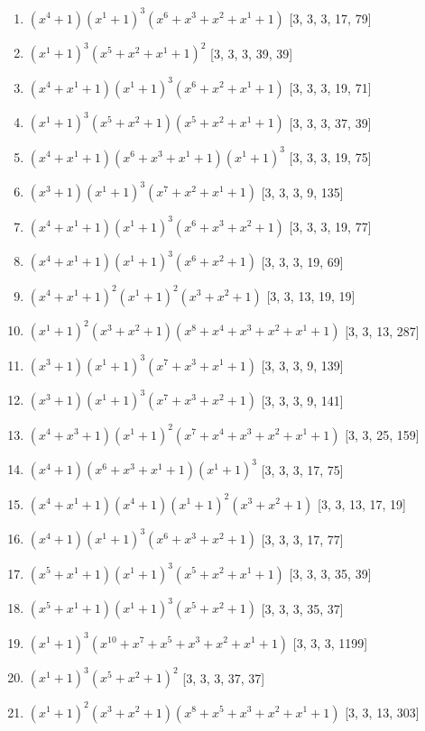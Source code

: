 \documentclass[10pt,twocolumn]{article}
\begin{document}
\begin{enumerate}
\item $(x^{4} + 1)(x^{1} + 1)^{3}(x^{6} + x^{3} + x^{2} + x^{1} + 1)$  [3, 3, 3, 17, 79]
\item $(x^{1} + 1)^{3}(x^{5} + x^{2} + x^{1} + 1)^{2}$  [3, 3, 3, 39, 39]
\item $(x^{4} + x^{1} + 1)(x^{1} + 1)^{3}(x^{6} + x^{2} + x^{1} + 1)$  [3, 3, 3, 19, 71]
\item $(x^{1} + 1)^{3}(x^{5} + x^{2} + 1)(x^{5} + x^{2} + x^{1} + 1)$  [3, 3, 3, 37, 39]
\item $(x^{4} + x^{1} + 1)(x^{6} + x^{3} + x^{1} + 1)(x^{1} + 1)^{3}$  [3, 3, 3, 19, 75]
\item $(x^{3} + 1)(x^{1} + 1)^{3}(x^{7} + x^{2} + x^{1} + 1)$  [3, 3, 3, 9, 135]
\item $(x^{4} + x^{1} + 1)(x^{1} + 1)^{3}(x^{6} + x^{3} + x^{2} + 1)$  [3, 3, 3, 19, 77]
\item $(x^{4} + x^{1} + 1)(x^{1} + 1)^{3}(x^{6} + x^{2} + 1)$  [3, 3, 3, 19, 69]
\item $(x^{4} + x^{1} + 1)^{2}(x^{1} + 1)^{2}(x^{3} + x^{2} + 1)$  [3, 3, 13, 19, 19]
\item $(x^{1} + 1)^{2}(x^{3} + x^{2} + 1)(x^{8} + x^{4} + x^{3} + x^{2} + x^{1} + 1)$  [3, 3, 13, 287]
\item $(x^{3} + 1)(x^{1} + 1)^{3}(x^{7} + x^{3} + x^{1} + 1)$  [3, 3, 3, 9, 139]
\item $(x^{3} + 1)(x^{1} + 1)^{3}(x^{7} + x^{3} + x^{2} + 1)$  [3, 3, 3, 9, 141]
\item $(x^{4} + x^{3} + 1)(x^{1} + 1)^{2}(x^{7} + x^{4} + x^{3} + x^{2} + x^{1} + 1)$  [3, 3, 25, 159]
\item $(x^{4} + 1)(x^{6} + x^{3} + x^{1} + 1)(x^{1} + 1)^{3}$  [3, 3, 3, 17, 75]
\item $(x^{4} + x^{1} + 1)(x^{4} + 1)(x^{1} + 1)^{2}(x^{3} + x^{2} + 1)$  [3, 3, 13, 17, 19]
\item $(x^{4} + 1)(x^{1} + 1)^{3}(x^{6} + x^{3} + x^{2} + 1)$  [3, 3, 3, 17, 77]
\item $(x^{5} + x^{1} + 1)(x^{1} + 1)^{3}(x^{5} + x^{2} + x^{1} + 1)$  [3, 3, 3, 35, 39]
\item $(x^{5} + x^{1} + 1)(x^{1} + 1)^{3}(x^{5} + x^{2} + 1)$  [3, 3, 3, 35, 37]
\item $(x^{1} + 1)^{3}(x^{10} + x^{7} + x^{5} + x^{3} + x^{2} + x^{1} + 1)$  [3, 3, 3, 1199]
\item $(x^{1} + 1)^{3}(x^{5} + x^{2} + 1)^{2}$  [3, 3, 3, 37, 37]
\item $(x^{1} + 1)^{2}(x^{3} + x^{2} + 1)(x^{8} + x^{5} + x^{3} + x^{2} + x^{1} + 1)$  [3, 3, 13, 303]

\end{enumerate}
\end{document}
